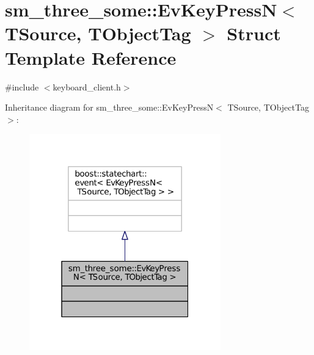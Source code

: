 \hypertarget{structsm__three__some_1_1EvKeyPressN}{}\section{sm\+\_\+three\+\_\+some\+:\+:Ev\+Key\+PressN$<$ T\+Source, T\+Object\+Tag $>$ Struct Template Reference}
\label{structsm__three__some_1_1EvKeyPressN}


{\ttfamily \#include $<$keyboard\+\_\+client.\+h$>$}



Inheritance diagram for sm\+\_\+three\+\_\+some\+:\+:Ev\+Key\+PressN$<$ T\+Source, T\+Object\+Tag $>$\+:
\nopagebreak
\begin{figure}[H]
\begin{center}
\leavevmode
\includegraphics[width=235pt]{structsm__three__some_1_1EvKeyPressN__inherit__graph}
\end{center}
\end{figure}


